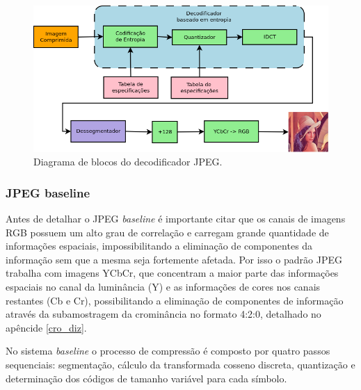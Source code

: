 \begin{figure}[!ht]
  \begin{center}
    \includegraphics[scale=0.45]{./Figures/png/jpeg_decoder.png}
      \caption{Diagrama de blocos do decodificador JPEG.}
      \label{fig:jpeg_dec}
  \end{center}
\end{figure}

\subsubsection{JPEG baseline}
\label{JPEG_baseline}

Antes de detalhar o JPEG \textit{baseline} é importante citar que os canais de imagens RGB possuem um alto grau de correlação e carregam grande quantidade de informações espaciais, impossibilitando a eliminação de componentes da informação sem que a mesma seja fortemente afetada. Por isso o padrão JPEG trabalha com imagens YCbCr, que concentram a maior parte das informações espaciais no canal da luminância (Y) e as informações de cores nos canais restantes (Cb e Cr), possibilitando a eliminação de componentes de informação através da subamostragem da crominância \cite{Bhaskaran:1997:IVC:549617} no formato 4:2:0, detalhado no apêncide \ref{cro_diz}.

No sistema \textit{baseline} \cite{Gonzalez2006} o processo de compressão é composto por quatro passos sequenciais: segmentação, cálculo da transformada cosseno discreta, quantização e determinação dos códigos de tamanho variável para cada símbolo.

